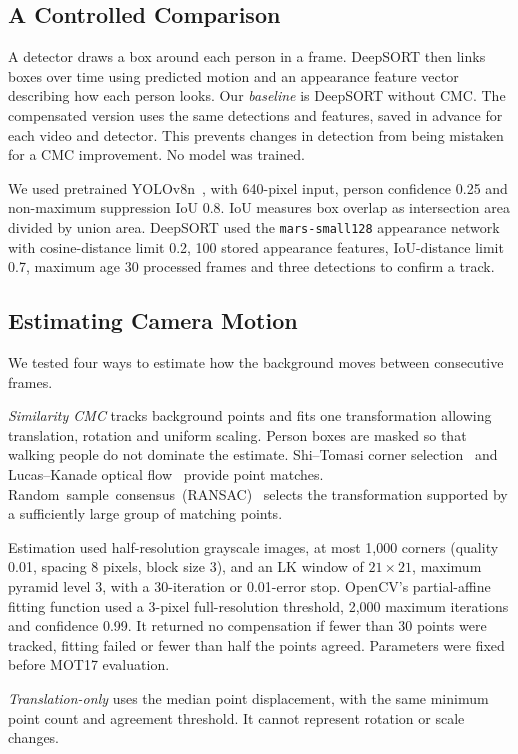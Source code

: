 \documentclass[conference]{IEEEtran}
\begin{document}
\subsection{A Controlled Comparison}
A detector draws a box around each person in a frame. DeepSORT then links boxes over time using predicted motion and an appearance feature vector describing how each person looks. Our \emph{baseline} is DeepSORT without CMC. The compensated version uses the same detections and features, saved in advance for each video and detector. This prevents changes in detection from being mistaken for a CMC improvement. No model was trained.

We used pretrained YOLOv8n~\cite{jocher2023yolov8}, with 640-pixel input, person confidence 0.25 and non-maximum suppression IoU 0.8. IoU measures box overlap as intersection area divided by union area. DeepSORT used the \texttt{mars-small128} appearance network with cosine-distance limit 0.2, 100 stored appearance features, IoU-distance limit 0.7, maximum age 30 processed frames and three detections to confirm a track.

\subsection{Estimating Camera Motion}
We tested four ways to estimate how the background moves between consecutive frames.

\emph{Similarity CMC} tracks background points and fits one transformation allowing translation, rotation and uniform scaling. Person boxes are masked so that walking people do not dominate the estimate. Shi--Tomasi corner selection~\cite{shi1994good} and Lucas--Kanade optical flow~\cite{lucas1981iterative} provide point matches. \mbox{Random sample consensus (RANSAC)}~\cite{fischler1981ransac} selects the transformation supported by a sufficiently large group of matching points.

Estimation used half-resolution grayscale images, at most 1,000 corners (quality 0.01, spacing 8 pixels, block size 3), and an LK window of $21\times21$, maximum pyramid level 3, with a 30-iteration or 0.01-error stop. OpenCV's partial-affine fitting function used a 3-pixel full-resolution threshold, 2,000 maximum iterations and confidence 0.99. It returned no compensation if fewer than 30 points were tracked, fitting failed or fewer than half the points agreed. Parameters were fixed before MOT17 evaluation.

\emph{Translation-only} uses the median point displacement, with the same minimum point count and agreement threshold. It cannot represent rotation or scale changes.
\end{document}
